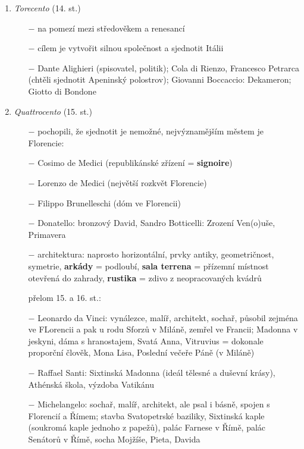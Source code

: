 \documentclass{article}
\begin{document}
\begin{enumerate}
    \vspace{-0.5em}
    \setlength\itemsep{0.15em}
    \item \textit{Torecento} (14. st.)
        \begin{itemize}
            \vspace{-0.5em}
            \setlength\itemsep{0.15em}
            \item[$-$] na pomezí mezi středověkem a renesancí
            \item[$-$] cílem je vytvořit silnou společnost a sjednotit Itálii
            \item[$-$] Dante Alighieri (spisovatel, politik); Cola di Rienzo, Francesco Petrarca (chtěli sjednotit Apeninský polostrov); Giovanni Boccaccio: Dekameron; Giotto di Bondone
        \end{itemize}
    \item \textit{Quattrocento} (15. st.)
    \begin{itemize}
        \vspace{-0.5em}
        \setlength\itemsep{0.15em}
        \item[$-$] pochopili, že sjednotit je nemožné, nejvýznamějším městem je Florencie:
        \item[$-$] Cosimo de Medici (republikánské zřízení = \textbf{signoire})
        \item[$-$] Lorenzo de Medici (největší rozkvět Florencie)
        \item[$-$] Filippo Brunelleschi (dóm ve Florencii)
        \item[$-$] Donatello: bronzový David, Sandro Botticelli: Zrození Ven(o)uše, Primavera
        \item[$-$] architektura: naprosto horizontální, prvky antiky, geometričnost, symetrie, \textbf{arkády} = podloubí, \textbf{sala terrena} = přízemní místnost otevřená do zahrady, \textbf{rustika} = zdivo z neopracovaných kvádrů
        \item[] přelom 15. a 16. st.:
        \item[$-$] Leonardo da Vinci: vynálezce, malíř, architekt, sochař, působil zejména ve FLorencii a pak u rodu Sforzů v Miláně, zemřel ve Francii; Madonna v jeskyni, dáma s hranostajem, Svatá Anna, Vitruvius = dokonale proporční člověk, Mona Lisa, Poslední večeře Páně (v Miláně)
        \item[$-$] Raffael Santi: Sixtinská Madonna (ideál tělesné a duševní krásy), Athénská škola, výzdoba Vatikánu
        \item[$-$] Michelangelo: sochař, malíř, architekt, ale psal i básně, spojen s Florencií a Římem; stavba Svatopetrské baziliky, Sixtinská kaple (soukromá kaple jednoho z papežů), palác Farnese v Římě, palác Senátorů v Římě, socha Mojžíše, Pieta, Davida

\end{itemize}
\end{enumerate}
\end{document}
